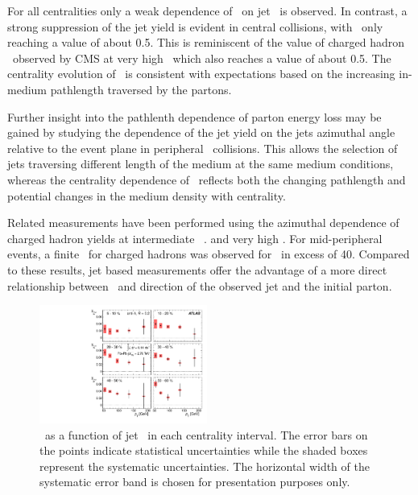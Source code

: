 For all centralities only a weak dependence of \Rcp\ on jet \pT\ is observed. 
In contrast, a strong suppression of the jet yield is evident in
central collisions, with \Rcp\ only reaching a value of about 0.5. 
This is reminiscent of the value of charged hadron \Raa\ observed 
by CMS at very high \pT\, which also reaches a value of about 0.5.
The centrality evolution of \Rcp\ is consistent with expectations
based on the increasing in-medium pathlength traversed by the partons.

Further insight into the pathlenth dependence of parton energy 
loss may be gained by studying the dependence of the jet yield
on the jets azimuthal angle relative to the event plane
in peripheral \PbPb\ collisions. This allows the selection of jets 
traversing different length of the medium at the same medium 
conditions, whereas the centrality dependence of \Rcp\ reflects 
both the changing pathlength and potential changes in the medium
density with centrality.

Related measurements have been performed using the azimuthal dependence 
of charged hadron yields at intermediate \pT\
\cite{Adams:2004wz,Adler:2006bw,Adare:2010sp, ATLAS:2011ah, Abelev:2012di}. 
and very high \pT \cite{Chatrchyan:2012xq}. For mid-peripheral events,
a finite \vtwo\ for charged hadrons was observed for \pT\ in excess of 40\GeVc.
Compared to these results, jet based measurements offer the advantage
of a more direct relationship between \pT\ and direction of the observed 
jet and the initial parton.

\begin{figure}[!h]
\begin{center}
\includegraphics[width=0.49\textwidth]{jetfigures/ATLAS_jetv2.pdf}
\caption{\vtjet\ as a function of jet \pT\ in each centrality
   interval. The error bars on the points indicate statistical
   uncertainties while the shaded boxes represent the systematic
   uncertainties. The horizontal width of the systematic
   error band is chosen for presentation purposes only. }
\label{fig:GR:ATLAS_jet_v2}
\end{center}
\end{figure}

